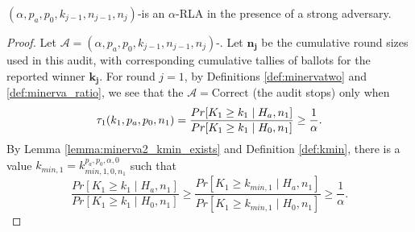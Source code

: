 \begin{theorem}
\label{thm:minerva2_is_rla_new}
$(\alpha,p_a, p_0,k_{j-1},n_{j-1},n_j)$-\Providence is an
$\alpha$-RLA in the presence of a strong adversary.
\end{theorem}
\begin{proof}
Let $\mathcal{A}=(\alpha,p_a, p_0,k_{j-1},n_{j-1},n_j)$-\Providence.
Let $\bm{n_j}$ be the cumulative round sizes used in this
audit, with corresponding cumulative tallies of
ballots for the reported winner $\bm{k_j}$.
For round $j=1$, by Definitions \ref{def:minervatwo}
and \ref{def:minerva_ratio}, we see that
the $\mathcal{A}=\text{Correct}$ (the audit stops) only when
$$
\tau_1(k_{1},p_a,p_0,n_1)\\
=\frac{Pr[K_{1} \geq k_{1} \mid H_a, n_1]}{Pr[K_{1} \geq k_{1} \mid H_0, n_1]}
\ge \frac{1}{\alpha}.
$$
By Lemma \ref{lemma:minerva2_kmin_exists} and Definition \ref{def:kmin}, there is 
a value $k_{min,1} = k^{p_a, p_0, \alpha, 0}_{min, 1, 0, n_1}$ such that 
$$
\frac{Pr[K_{1} \geq k_{1} \mid H_a, n_1]}{Pr[K_{1} \geq k_{1} \mid H_0, n_1]}
\ge
\frac{Pr[K_{1} \geq k_{min,1} \mid H_a, n_1]}{Pr[K_{1} \geq k_{min, 1} \mid H_0, n_1]}
\ge 
\frac{1}{\alpha}.
$$


\end{proof}
